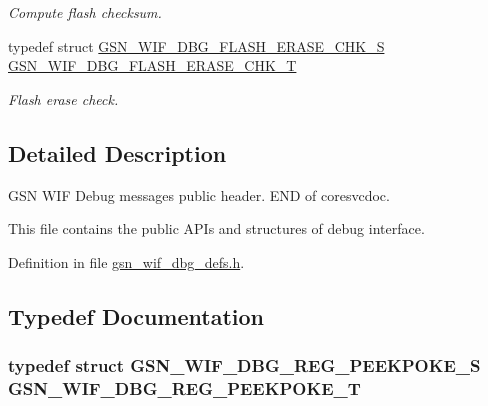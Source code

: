 \begin{DoxyCompactItemize}
\begin{DoxyCompactList}\small\item\em Compute flash checksum. \end{DoxyCompactList}\item 
typedef struct \hyperlink{a00328}{GSN\_\-WIF\_\-DBG\_\-FLASH\_\-ERASE\_\-CHK\_\-S} \hyperlink{a00637_gaa7c0146330fb5ac3b4707339435d871d}{GSN\_\-WIF\_\-DBG\_\-FLASH\_\-ERASE\_\-CHK\_\-T}
\begin{DoxyCompactList}\small\item\em Flash erase check. \end{DoxyCompactList}\end{DoxyCompactItemize}


\subsection{Detailed Description}
GSN WIF Debug messages public header. END of coresvcdoc.

This file contains the public APIs and structures of debug interface. 

Definition in file \hyperlink{a00609_source}{gsn\_\-wif\_\-dbg\_\-defs.h}.



\subsection{Typedef Documentation}
\hypertarget{a00609_ab69f8b4406cd0f30cbc9ea70450add1d}{
\subsubsection[{GSN\_\-WIF\_\-DBG\_\-REG\_\-PEEKPOKE\_\-T}]{\setlength{\rightskip}{0pt plus 5cm}typedef struct {\bf GSN\_\-WIF\_\-DBG\_\-REG\_\-PEEKPOKE\_\-S}  {\bf GSN\_\-WIF\_\-DBG\_\-REG\_\-PEEKPOKE\_\-T}}}
\label{a00609_ab69f8b4406cd0f30cbc9ea70450add1d}
